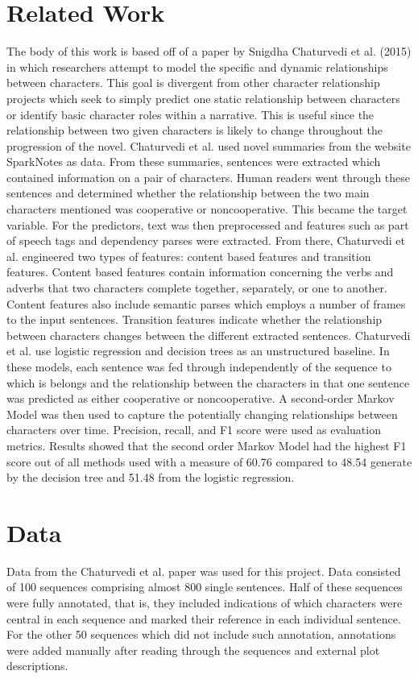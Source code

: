 \documentclass[11pt,a4paper]{article}
\begin{document}
\section{Related Work}

The body of this work is based off of a paper by Snigdha Chaturvedi et al. (2015) in which researchers attempt to model the specific and dynamic relationships between characters. This goal is divergent from other character relationship projects which seek to simply predict one static relationship between characters or identify basic character roles within a narrative. This is useful since the relationship between two given characters is likely to change throughout the progression of the novel. Chaturvedi et al. used novel summaries from the website SparkNotes as data. From these summaries, sentences were extracted which contained information on a pair of characters. Human readers went through these sentences and determined whether the relationship between the two main characters mentioned was cooperative or noncooperative. This became the target variable. For the predictors, text was then preprocessed and features such as part of speech tags and dependency parses were extracted. From there, Chaturvedi et al. engineered two types of features: content based features and transition features. 
Content based features contain information concerning the verbs and adverbs that two characters complete together, separately, or one to another. Content features also include semantic parses which employs a number of frames to the input sentences. Transition features indicate whether the relationship between characters changes between the different extracted sentences. 
Chaturvedi et al. use logistic regression and decision trees as an unstructured baseline. In these models, each sentence was fed through independently of the sequence to which is belongs and the relationship between the characters in that one sentence was predicted as either cooperative or noncooperative. A second-order Markov Model was then used to capture the potentially changing relationships between characters over time. Precision, recall, and F1 score were used as evaluation metrics. Results showed that the second order Markov Model had the highest F1 score out of all methods used with a measure of 60.76 compared to 48.54 generate by the decision tree and 51.48 from the logistic regression. 

\section{Data}
Data from the Chaturvedi et al. paper was used for this project. Data consisted of 100 sequences comprising almost 800 single sentences. Half of these sequences were fully annotated, that is, they included indications of which characters were central in each sequence and marked their reference in each individual sentence. For the other 50 sequences which did not include such annotation, annotations were added manually after reading through the sequences and external plot descriptions.
\end{document}
